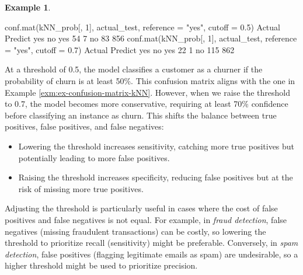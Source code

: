 \documentclass[
  11pt,
]{book}
\makeatletter
\newenvironment{Shaded}{}{}
\newcommand{\AttributeTok}[1]{#1}
\newcommand{\DecValTok}[1]{#1}
\newcommand{\FloatTok}[1]{#1}
\newcommand{\FunctionTok}[1]{#1}
\newcommand{\NormalTok}[1]{#1}
\newcommand{\StringTok}[1]{\textcolor[rgb]{0.39,0.39,0.39}{#1}}
\providecommand{\tightlist}{%
  \setlength{\itemsep}{0pt}\setlength{\parskip}{0pt}}
\newenvironment{kframe}{%
\medskip{}
\setlength{\fboxsep}{.8em}
 \def\at@end@of@kframe{}%
 \ifinner\ifhmode%
  \def\at@end@of@kframe{\end{minipage}}%
  \begin{minipage}{\columnwidth}%
 \fi\fi%
 \def\FrameCommand##1{\hskip\@totalleftmargin \hskip-\fboxsep
 \colorbox{shadecolor}{##1}\hskip-\fboxsep
     \hskip-\linewidth \hskip-\@totalleftmargin \hskip\columnwidth}%
 \MakeFramed {\advance\hsize-\width
   \@totalleftmargin\z@ \linewidth\hsize
   \@setminipage}}%
 {\par\unskip\endMakeFramed%
 \at@end@of@kframe}
\renewenvironment{Shaded}{\begin{kframe}}{\end{kframe}}
\theoremstyle{definition}
\theoremstyle{definition}
\newtheorem{example}{Example}[chapter]
\theoremstyle{definition}
\theoremstyle{definition}
\theoremstyle{remark}
\makeatother
\begin{document}
\begin{example}
\begin{Shaded}
\begin{Highlighting}[]
\FunctionTok{conf.mat}\NormalTok{(kNN\_prob[, }\DecValTok{1}\NormalTok{], actual\_test, }\AttributeTok{reference =} \StringTok{"yes"}\NormalTok{, }\AttributeTok{cutoff =} \FloatTok{0.5}\NormalTok{)}
\NormalTok{          Actual}
\NormalTok{   Predict yes  no}
\NormalTok{       yes  }\DecValTok{54}   \DecValTok{7}
\NormalTok{       no   }\DecValTok{83} \DecValTok{856}
\FunctionTok{conf.mat}\NormalTok{(kNN\_prob[, }\DecValTok{1}\NormalTok{], actual\_test, }\AttributeTok{reference =} \StringTok{"yes"}\NormalTok{, }\AttributeTok{cutoff =} \FloatTok{0.7}\NormalTok{)}
\NormalTok{          Actual}
\NormalTok{   Predict yes  no}
\NormalTok{       yes  }\DecValTok{22}   \DecValTok{1}
\NormalTok{       no  }\DecValTok{115} \DecValTok{862}
\end{Highlighting}
\end{Shaded}

At a threshold of 0.5, the model classifies a customer as a churner if the probability of churn is at least 50\%. This confusion matrix aligns with the one in Example \ref{exm:ex-confusion-matrix-kNN}. However, when we raise the threshold to 0.7, the model becomes more conservative, requiring at least 70\% confidence before classifying an instance as churn. This shifts the balance between true positives, false positives, and false negatives:

\begin{itemize}
\tightlist
\item
  Lowering the threshold increases sensitivity, catching more true positives but potentially leading to more false positives.\\
\item
  Raising the threshold increases specificity, reducing false positives but at the risk of missing more true positives.
\end{itemize}

Adjusting the threshold is particularly useful in cases where the cost of false positives and false negatives is not equal. For example, in \emph{fraud detection}, false negatives (missing fraudulent transactions) can be costly, so lowering the threshold to prioritize recall (sensitivity) might be preferable. Conversely, in \emph{spam detection}, false positives (flagging legitimate emails as spam) are undesirable, so a higher threshold might be used to prioritize precision.
\end{example}
\end{document}

